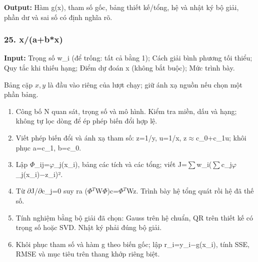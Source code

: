 \textbf{Output:} Hàm g(\allowbreak{}x),\allowbreak{} tham số gốc,\allowbreak{} bảng thiết kế/\allowbreak{}tổng,\allowbreak{} hệ và nhật ký bộ giải,\allowbreak{} phần dư và sai số có định nghĩa rõ.

\examplebreak\subsubsection*{25. x/\allowbreak{}(\allowbreak{}a+\allowbreak{}b*x)}

\textbf{Input:} Trọng số w\_i (\allowbreak{}để trống: tất cả bằng 1);\allowbreak{} Cách giải bình phương tối thiểu;\allowbreak{} Quy tắc khi thiếu hạng;\allowbreak{} Điểm dự đoán x (\allowbreak{}không bắt buộc);\allowbreak{} Mức trình bày.

Bảng cặp $x,y$ là đầu vào riêng của lượt chạy; giữ ánh xạ nguồn nếu chọn một phần bảng.

\begin{enumerate}

\item Công bố N quan sát,\allowbreak{} trọng số và mô hình. Kiểm tra miền,\allowbreak{} dấu và hạng;\allowbreak{} không tự lọc dòng để ép phép biến đổi hợp lệ.

\item Viết phép biến đổi và ánh xạ tham số: z=\allowbreak{}1/\allowbreak{}y,\allowbreak{} u=\allowbreak{}1/\allowbreak{}x,\allowbreak{} z\ensuremath{\approx}c\_0+\allowbreak{}c\_1u;\allowbreak{} khôi phục a=\allowbreak{}c\_1,\allowbreak{} b=\allowbreak{}c\_0.

\item Lập \ensuremath{\Phi}\_ij=\allowbreak{}\ensuremath{\varphi}\_j(\allowbreak{}x\_i),\allowbreak{} bảng các tích và các tổng;\allowbreak{} viết J=\allowbreak{}\ensuremath{\sum}w\_i(\allowbreak{}\ensuremath{\sum}c\_j\ensuremath{\varphi}\_j(\allowbreak{}x\_i)\ensuremath{-}z\_i)².

\item Từ \ensuremath{\partial}J/\allowbreak{}\ensuremath{\partial}c\_j=\allowbreak{}0 suy ra (\allowbreak{}\ensuremath{\Phi}\ensuremath{{}^T}W\ensuremath{\Phi})c=\allowbreak{}\ensuremath{\Phi}\ensuremath{{}^T}Wz. Trình bày hệ tổng quát rồi hệ đã thế số.

\item Tính nghiệm bằng bộ giải đã chọn: Gauss trên hệ chuẩn,\allowbreak{} QR trên thiết kế có trọng số hoặc SVD. Nhật ký phải đúng bộ giải.

\item Khôi phục tham số và hàm g theo biến gốc;\allowbreak{} lập r\_i=\allowbreak{}y\_i\ensuremath{-}g(\allowbreak{}x\_i),\allowbreak{} tính SSE,\allowbreak{} RMSE và mục tiêu trên thang khớp riêng biệt.

\end{enumerate}

